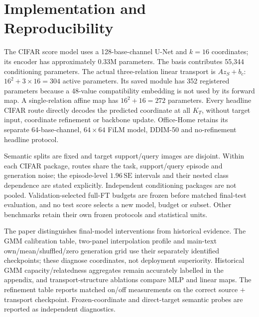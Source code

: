 \section{Implementation and Reproducibility}
The CIFAR score model uses a 128-base-channel U-Net and $k=16$ coordinates; its encoder has approximately 0.33M parameters. The basis contributes 55,344 conditioning parameters. The actual three-relation linear transport is $Az_S+b_c$: $16^2+3\times16=304$ active parameters. Its saved module has 352 registered parameters because a 48-value compatibility embedding is not used by its forward map. A single-relation affine map has $16^2+16=272$ parameters. Every headline CIFAR route directly decodes the predicted coordinate at all $K_T$, without target input, coordinate refinement or backbone update. Office-Home retains its separate 64-base-channel, $64\times64$ FiLM model, DDIM-50 and no-refinement headline protocol.

Semantic splits are fixed and target support/query images are disjoint. Within each CIFAR package, routes share the task, support/query episode and generation noise; the episode-level $1.96\,\mathrm{SE}$ intervals and their nested class dependence are stated explicitly. Independent conditioning packages are not pooled. Validation-selected full-FT budgets are frozen before matched final-test evaluation, and no test score selects a new model, budget or subset. Other benchmarks retain their own frozen protocols and statistical units.

The paper distinguishes final-model interventions from historical evidence. The GMM calibration table, two-panel interpolation profile and main-text own/mean/shuffled/zero generation grid use their separately identified checkpoints; these diagnose coordinates, not deployment superiority. Historical GMM capacity/relatedness aggregates remain accurately labelled in the appendix, and transport-structure ablations compare MLP and linear maps. The refinement table reports matched on/off measurements on the correct source $+$ transport checkpoint. Frozen-coordinate and direct-target semantic probes are reported as independent diagnostics.